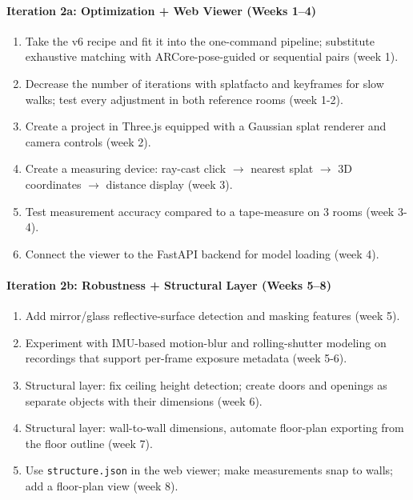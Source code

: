 \paragraph{Iteration 2a: Optimization + Web Viewer (Weeks 1--4)}
\begin{enumerate}
    \item Take the v6 recipe and fit it into the one-command pipeline; substitute exhaustive matching with ARCore-pose-guided or sequential pairs (week 1).
    \item Decrease the number of iterations with splatfacto and keyframes for slow walks; test every adjustment in both reference rooms (week 1-2).
    \item Create a project in Three.js equipped with a Gaussian splat renderer and camera controls (week 2).
    \item Create a measuring device: ray-cast click $\rightarrow$ nearest splat $\rightarrow$ 3D coordinates $\rightarrow$ distance display (week 3).
    \item Test measurement accuracy compared to a tape-measure on 3 rooms (week 3-4).
    \item Connect the viewer to the FastAPI backend for model loading (week 4).
\end{enumerate}

\paragraph{Iteration 2b: Robustness + Structural Layer (Weeks 5--8)}
\begin{enumerate}
    \item Add mirror/glass reflective-surface detection and masking features (week 5).
    \item Experiment with IMU-based motion-blur and rolling-shutter modeling on recordings that support per-frame exposure metadata (week 5-6).
    \item Structural layer: fix ceiling height detection; create doors and openings as separate objects with their dimensions (week 6).
    \item Structural layer: wall-to-wall dimensions, automate floor-plan exporting from the floor outline (week 7).
    \item Use \texttt{structure.json} in the web viewer; make measurements snap to walls; add a floor-plan view (week 8).
\end{enumerate}


